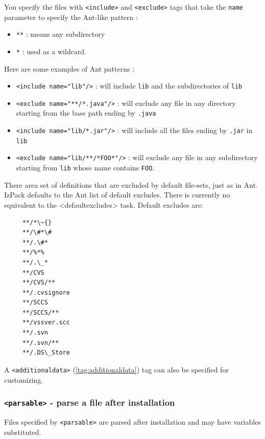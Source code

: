 You specify the files with  \texttt{<include>} and \texttt{<exclude>} tags
that take the \texttt{name} parameter to specify the Ant-like pattern :
\begin{itemize}    
  \item \texttt{**} : means any subdirectory
  \item \texttt{*} : used as a wildcard.
\end{itemize}
Here are some examples of Ant patterns :
\begin{itemize}

  \item \texttt{<include name="lib"/>} : will include \texttt{lib} and the
  subdirectories of \texttt{lib}

  \item \texttt{<exclude name="**/*.java"/>} : will exclude any file in any
  directory starting from the base path ending by \texttt{.java}

  \item \texttt{<include name="lib/*.jar"/>} : will include all the files
  ending by \texttt{.jar} in \texttt{lib}

  \item \texttt{<exclude name="lib/**/*FOO*"/>} : will exclude any file in
  any subdirectory starting from \texttt{lib} whose name contains
  \texttt{FOO}.

\end{itemize}

There area set of definitions that are excluded by default file-sets,
just as in Ant. IzPack defaults to the Ant list of default
excludes. There is currently no equivalent to the <defaultexcludes>
task. Default excludes are:
\footnotesize
\begin{verbatim}
     **/*\~{}
     **/\#*\#
     **/.\#*
     **/%*%
     **/.\_*
     **/CVS
     **/CVS/**
     **/.cvsignore
     **/SCCS
     **/SCCS/**
     **/vssver.scc
     **/.svn
     **/.svn/**
     **/.DS\_Store
\end{verbatim}
\normalsize
A \texttt{<additionaldata>} (\ref{tag:additionaldata})
tag can also be specified for customizing.

\subsubsection{\texttt{<parsable>} - parse a file after installation}

Files specified by \texttt{<parsable>} are parsed after installation and may
have variables substituted.

